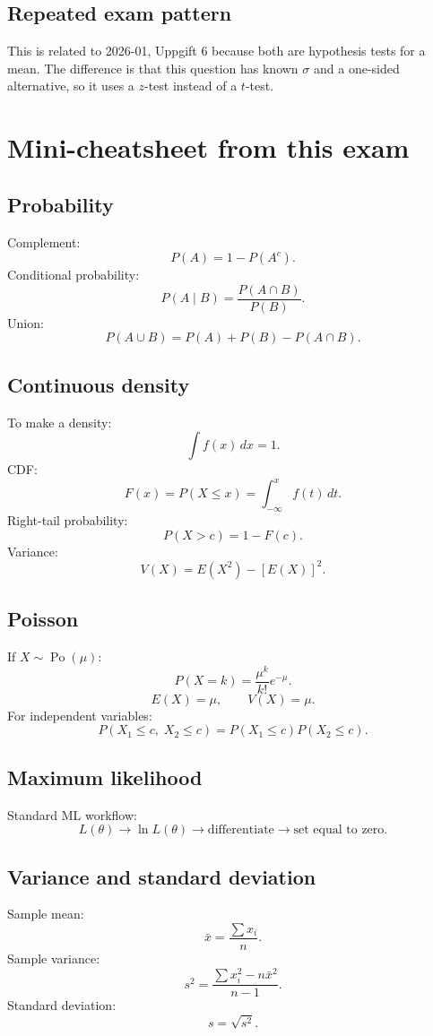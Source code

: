 \documentclass[11pt,a4paper]{article}
\begin{document}
\subsection*{Repeated exam pattern}
This is related to 2026-01, Uppgift 6 because both are hypothesis tests for a mean. The difference is that this question has known \(\sigma\) and a one-sided alternative, so it uses a \(z\)-test instead of a \(t\)-test.

\section*{Mini-cheatsheet from this exam}

\subsection*{Probability}
Complement:
\[
P(A)=1-P(A^c).
\]
Conditional probability:
\[
P(A\mid B)=\frac{P(A\cap B)}{P(B)}.
\]
Union:
\[
P(A\cup B)=P(A)+P(B)-P(A\cap B).
\]

\subsection*{Continuous density}
To make a density:
\[
\int f(x)\,dx=1.
\]
CDF:
\[
F(x)=P(X\le x)=\int_{-\infty}^{x}f(t)\,dt.
\]
Right-tail probability:
\[
P(X>c)=1-F(c).
\]
Variance:
\[
V(X)=E(X^2)-[E(X)]^2.
\]

\subsection*{Poisson}
If \(X\sim \operatorname{Po}(\mu)\):
\[
P(X=k)=\frac{\mu^k}{k!}e^{-\mu}.
\]
\[
E(X)=\mu,\qquad V(X)=\mu.
\]
For independent variables:
\[
P(X_1\le c,\;X_2\le c)=P(X_1\le c)P(X_2\le c).
\]

\subsection*{Maximum likelihood}
Standard ML workflow:
\[
L(\theta)\rightarrow \ln L(\theta)\rightarrow \text{differentiate}\rightarrow \text{set equal to zero}.
\]

\subsection*{Variance and standard deviation}
Sample mean:
\[
\bar{x}=\frac{\sum x_i}{n}.
\]
Sample variance:
\[
s^2=\frac{\sum x_i^2-n\bar{x}^2}{n-1}.
\]
Standard deviation:
\[
s=\sqrt{s^2}.
\]
\end{document}
